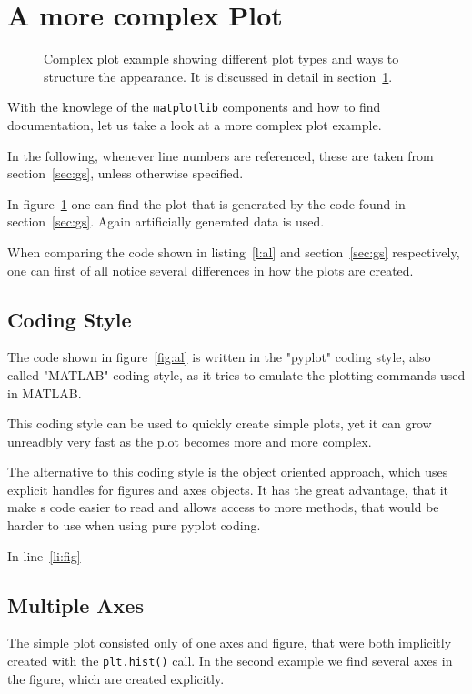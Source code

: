 \documentclass[a4paper, 11pt, onecolumn]{article}
\newcommand{\mpl}{\texttt{matplotlib}\xspace}
\newcommand{\pl}[1]{\mbox{\texttt{#1}\xspace}}
\newcommand{\baseref}[3]{\mbox{#1 \ref{#2:#3}\xspace}}
\newcommand{\fig}[1]{\baseref{figure}{fig}{#1}}
\renewcommand{\sec}[1]{\baseref{section}{sec}{#1}}
\newcommand{\lis}[1]{\baseref{listing}{l}{#1}}
\newcommand{\lin}[1]{\baseref{line}{li}{#1}}
\begin{document}
\section{A more complex Plot}

\label{sec:plt}

\begin{figure}[ht!]
\centering

\caption{Complex plot example showing different plot types and ways to
         structure the appearance. It is discussed in detail in \sec{plt}.}
\label{fig:gs}
\end{figure}

With the knowlege of the \mpl components and how to find documentation, let us
take a look at a more complex plot example.


In the following, whenever line numbers are referenced, these are taken from
\sec{gs}, unless otherwise specified.

In \fig{gs} one can find the plot that is generated by the code
found in \sec{gs}. Again artificially generated data is used.

When comparing the code shown in \lis{al} and \sec{gs}
respectively, one can first of all notice several differences in how the plots
are created.

\subsection{Coding Style}
The code shown in \fig{al} is written in the "pyplot" coding style,
also called "MATLAB" coding style, as it tries to emulate the plotting commands
used in MATLAB.

This coding style can be used to quickly create simple plots, yet it can
grow unreadbly very fast as the plot becomes more and more complex.

The alternative to this coding style is the object oriented approach, which 
uses explicit handles for figures and axes objects. It has the great advantage,
that it make s code easier to read and allows access to more methods, that 
would be harder to use when using pure pyplot coding.

In \lin{fig} 


\subsection{Multiple Axes}

The simple plot consisted only of one axes and figure, that were both
implicitly created with the \pl{plt.hist()} call. In the second example we find
several axes in the figure, which are created explicitly.
\end{document}
